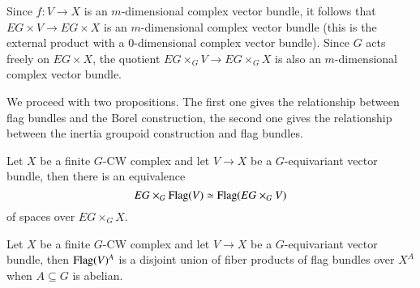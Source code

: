 Since $f \colon V \rightarrow X$ is an $m$-dimensional complex vector bundle, it follows that $EG \times V \rightarrow EG \times X$ is an $m$-dimensional complex vector bundle (this is the external product with a $0$-dimensional complex vector bundle). Since $G$ acts freely on $EG \times X$, the quotient $EG \times_G V \rightarrow EG \times_G X$ is also an $m$-dimensional complex vector bundle.

We proceed with two propositions. The first one gives the relationship between flag bundles and the Borel construction, the second one gives the relationship between the inertia groupoid construction and flag bundles.

\begin{proposition}
Let $X$ be a finite $G$-CW complex and let $V \rightarrow X$ be a $G$-equivariant vector bundle, then there is an equivalence
\[
EG \times_G \operatorname{Flag}(V) \simeq \operatorname{Flag}(EG \times_G V)
\]
of spaces over $EG \times_G X$.
\end{proposition}

\begin{proposition}
Let $X$ be a finite $G$-CW complex and let $V \rightarrow X$ be a $G$-equivariant vector bundle, then $\operatorname{Flag}(V)^A$ is a disjoint union of fiber products of flag bundles over $X^A$ when $A \subseteq G$ is abelian.
\end{proposition}

